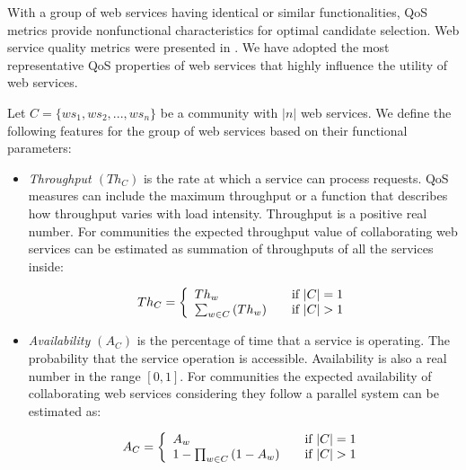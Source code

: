With a group of web services having identical or similar functionalities, QoS metrics provide nonfunctional characteristics for optimal candidate selection. Web service quality metrics were presented in \cite{Ardagna:2007:ASC:1263152.1263531,Menasce:2002:QIW:613357.613758,10.1109/ISSRE.2011.17}. We have adopted the most representative QoS properties of web services that highly influence the utility of web services.

Let $C = \{ws_1,ws_2,..., ws_n\}$ be a community with $|n|$ web services. We define the following features for the group of web services based on their functional parameters:

\begin{itemize}

  \item \emph{Throughput $(Th_{C})$} is the rate at which a service can process requests. QoS measures can include the maximum throughput or a function that describes how throughput varies with load intensity. Throughput is a positive real number. For communities the expected throughput value of collaborating web services can be estimated as summation of throughputs of all the services inside:
	
	\begin{equation}
		 Th_{C} = \left\{
			\begin{array}{l l}
				Th_{w} & \quad \text{if $|C| = 1$}\\
				\sum_{w \in C}{(Th_{w})} & \quad \text{if $|C| > 1$}
			\end{array} \right.
	\end{equation}
	
	\item \emph{Availability $(A_{C})$} is the percentage of time that a service is operating.
	The probability that the service operation is accessible. Availability is also a real number in the range $[0, 1]$. For communities the expected availability of collaborating web services considering they follow a parallel system can be estimated as:
	
	\begin{equation}
		A_{C} = \left\{
			\begin{array}{l l}
				A_{w} & \quad \text{if $|C| = 1$}\\
				1-\prod_{w \in C}{(1-A_{w})} & \quad \text{if $|C| > 1$}
			\end{array} \right.
	\end{equation}
	

\end{itemize}
